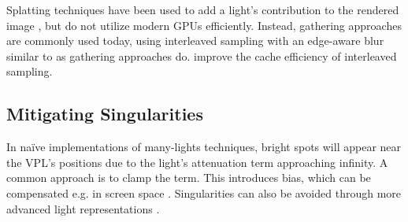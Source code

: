 Splatting techniques have been used to add a light's contribution to the rendered image \citep{dachsbacher2006splatting, Nichols:2009:splatting}, but do not utilize modern GPUs efficiently. Instead, gathering approaches are commonly used today, using interleaved sampling \citep{Keller:2001:InterleavedSampling} with an edge-aware blur similar to \citep{laine2007incremental} as gathering approaches do. \cite{segovia2006non} improve the cache efficiency of interleaved sampling.



\subsection{Mitigating Singularities}
 In naïve implementations of many-lights techniques, bright spots will appear near the VPL’s positions due to the light’s attenuation term approaching infinity. A common approach is to clamp the term. This introduces bias, which can be compensated e.g. in screen space \citep{novak2011screen}. Singularities can also be avoided through more advanced light representations \citep{tokuyoshi2015vsgl}.



\cleardoublepage
